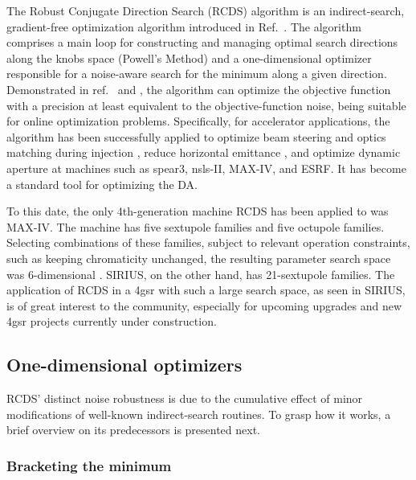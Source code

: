 The Robust Conjugate Direction Search (\gls*{RCDS}) algorithm is an indirect-search, gradient-free optimization algorithm introduced in Ref.~\cite{huang_algorithm_2013}. The algorithm comprises a main loop for constructing and managing optimal search directions along the knobs space (Powell's Method) and a one-dimensional optimizer responsible for a noise-aware search for the minimum along a given direction. Demonstrated in ref.~\cite{huang_algorithm_2013} and \cite[section 7.3.3]{huang_beam-based_2019}, the algorithm can optimize the objective function with a precision at least equivalent to the objective-function noise, being suitable for online optimization problems. Specifically, for accelerator applications, the algorithm has been successfully applied to optimize beam steering and optics matching during injection \cite{huang_algorithm_2013}, reduce horizontal emittance \cite{huang_algorithm_2013, huang_online_2015}, and optimize dynamic aperture \cite{huang_algorithm_2013, huang_online_2015,liuzzo_rcds_2016,olsson_online_2018,yang_online_2022} at machines such as \acrshort*{spear}3, \acrshort*{nsls}-II, MAX-IV, and \acrshort*{ESRF}. It has become a standard tool for optimizing the \gls*{DA}.

To this date, the only 4th-generation machine \gls*{RCDS} has been applied to was MAX-IV. The machine has five sextupole families and five octupole families. Selecting combinations of these families, subject to relevant operation constraints, such as keeping chromaticity unchanged, the resulting parameter search space was 6-dimensional \cite{olsson_online_2018}. SIRIUS, on the other hand, has 21-sextupole families. The application of \gls*{RCDS} in a \gls*{4gsr} with such a large search space, as seen in SIRIUS, is of great interest to the community, especially for upcoming upgrades and new \gls*{4gsr} projects currently under construction.

\subsection{One-dimensional optimizers}
\gls*{RCDS}' distinct noise robustness is due to the cumulative effect of minor modifications of well-known indirect-search routines. To grasp how it works, a brief overview on its predecessors is presented next.
\subsubsection{Bracketing the minimum}

